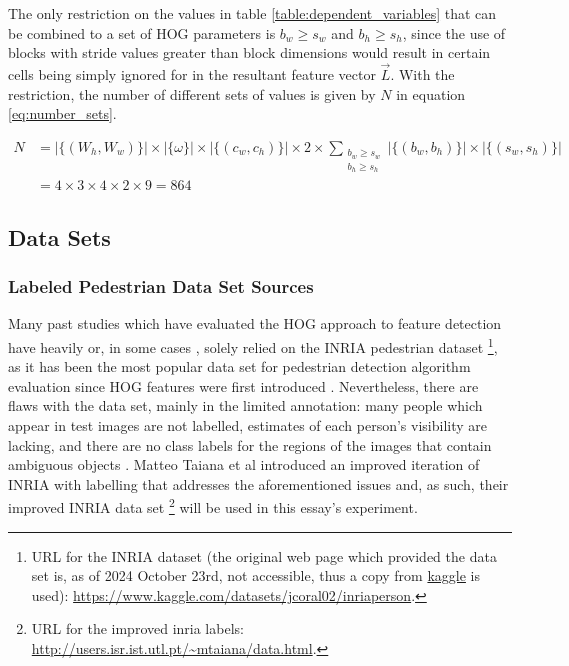     The only restriction on the values in table \ref{table:dependent_variables} that can be combined to a set of HOG parameters is $b_w\ge s_w$ and $b_h\ge s_h$, since the use of blocks with stride values greater than block dimensions would result in certain cells being simply ignored for in the resultant feature vector $\vec{L}$. With the restriction, the number of different sets of values is given by $N$ in equation \ref{eq:number_sets}.

    \begin{equation}\label{eq:number_sets}
    \begin{split}
    N &= |\{(W_h, W_w)\}| \times |\{\omega\}| \times |\{(c_w, c_h)\}| \times 2 \times \sum_{\substack{b_w \geq s_w \\ b_h \geq s_h}} |\{(b_w, b_h)\}| \times |\{(s_w, s_h)\}|  \\
    &= 4 \times 3 \times 4 \times 2 \times 9  =864
    \end{split}
    \end{equation}

    \subsection{Data Sets}

    \subsubsection{Labeled Pedestrian Data Set Sources}

    Many past studies which have evaluated the HOG approach to feature detection have heavily \cite{piotrdollr_2012_crosstalk} or, in some cases \cite{zhou_2021_research}, solely relied on the INRIA pedestrian dataset \footnote{URL for the INRIA dataset (the original web page which provided the data set is, as of 2024 October 23rd, not accessible, thus a copy from \href{kaggle.com}{kaggle} is used): \url{https://www.kaggle.com/datasets/jcoral02/inriaperson}.}, as it has been the most popular data set for pedestrian detection algorithm evaluation \cite{dollar_2012_pedestrian} since HOG features were first introduced \cite{dalal_2005_histograms}. Nevertheless, there are flaws with the data set, mainly in the limited annotation: many people which appear in test images are not labelled, estimates of each person’s visibility are lacking, and there are no class labels for the regions of the images that contain ambiguous objects \cite{inria_improved}. Matteo Taiana et al introduced an improved iteration of INRIA with labelling that addresses the aforementioned issues and, as such, their improved INRIA data set \footnote{URL for the improved inria labels: \url{http://users.isr.ist.utl.pt/~mtaiana/data.html}.} will be used in this essay's experiment.

